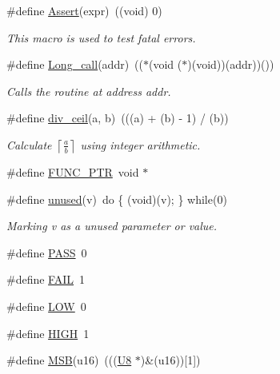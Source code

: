 \begin{DoxyCompactItemize}
\#define \mbox{\hyperlink{group__group__sam0__utils_gaab1e54dcc40192f9704e8b252635450f}{Assert}}(expr)~((void) 0)
\begin{DoxyCompactList}\small\item\em This macro is used to test fatal errors. \end{DoxyCompactList}\item 
\#define \mbox{\hyperlink{group__group__sam0__utils_ga5b759626f343cc1af9159cc02b763837}{Long\+\_\+call}}(addr)~(($\ast$(void ($\ast$)(void))(addr))())
\begin{DoxyCompactList}\small\item\em Calls the routine at address {\itshape addr}. \end{DoxyCompactList}\item 
\#define \mbox{\hyperlink{group__group__sam0__utils_ga6d4ebd841bc96041a7f3a61e227c1fb2}{div\+\_\+ceil}}(a,  b)~(((a) + (b) -\/ 1) / (b))
\begin{DoxyCompactList}\small\item\em Calculate $ \left\lceil \frac{a}{b} \right\rceil $ using integer arithmetic. \end{DoxyCompactList}\item 
\#define \mbox{\hyperlink{group__group__sam0__utils_gacce64924b686dd08a83042b35d0d1480}{F\+U\+N\+C\+\_\+\+P\+TR}}~void $\ast$
\item 
\#define \mbox{\hyperlink{group__group__sam0__utils_ga417dba7f63dde98dbebd6336d8af9d91}{unused}}(v)~do \{ (void)(v); \} while(0)
\begin{DoxyCompactList}\small\item\em Marking {\itshape v} as a unused parameter or value. \end{DoxyCompactList}\item 
\#define \mbox{\hyperlink{group__group__sam0__utils_gaba5c54fadff8d880b1945dde87496e31}{P\+A\+SS}}~0
\item 
\#define \mbox{\hyperlink{group__group__sam0__utils_gabb508ea8227673f419e9fe3a86c30d8e}{F\+A\+IL}}~1
\item 
\#define \mbox{\hyperlink{group__group__sam0__utils_gab811d8c6ff3a505312d3276590444289}{L\+OW}}~0
\item 
\#define \mbox{\hyperlink{group__group__sam0__utils_ga5bb885982ff66a2e0a0a45a8ee9c35e2}{H\+I\+GH}}~1
\item 
\#define \mbox{\hyperlink{group__group__sam0__utils_gabee1b74eceef5a0cf26efbf3ff87ccbf}{M\+SB}}(u16)~(((\mbox{\hyperlink{group__group__sam0__utils_gaa63ef7b996d5487ce35a5a66601f3e73}{U8}}  $\ast$)\&(u16))\mbox{[}1\mbox{]})

\end{DoxyCompactItemize}

